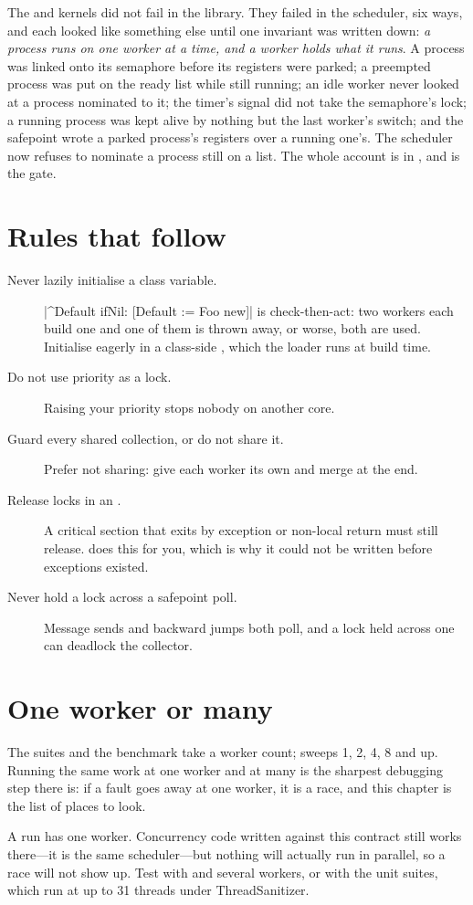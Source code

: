 The  and  kernels did not fail in the library. They
failed in the scheduler, six ways, and each looked like something else until
one invariant was written down: \emph{a process runs on one worker at a
time, and a worker holds what it runs}. A process was linked onto its
semaphore before its registers were parked; a preempted process was put on
the ready list while still running; an idle worker never looked at a process
nominated to it; the timer's signal did not take the semaphore's lock; a
running process was kept alive by nothing but the last worker's switch; and
the safepoint wrote a parked process's registers over a running one's. The
scheduler now refuses to nominate a process still on a list. The whole
account is in , and 
is the gate.

\section{Rules that follow}

\begin{description}
\item[Never lazily initialise a class variable.]
  \ct|^Default ifNil: [Default := Foo new]| is check-then-act: two workers
  each build one and one of them is thrown away, or worse, both are used.
  Initialise eagerly in a class-side , which the loader runs at
  build time.
\item[Do not use priority as a lock.] Raising your priority stops nobody on
  another core.
\item[Guard every shared collection, or do not share it.] Prefer not sharing:
  give each worker its own and merge at the end.
\item[Release locks in an .] A critical section that exits by
  exception or non-local return must still release.  does this for
  you, which is why it could not be written before exceptions existed.
\item[Never hold a lock across a safepoint poll.] Message sends and backward
  jumps both poll, and a lock held across one can deadlock the collector.
\end{description}

\section{One worker or many}

The suites and the benchmark take a worker count;  sweeps 1, 2,
4, 8 and up. Running the same work at one worker and at many is the sharpest
debugging step there is: if a fault goes away at one worker, it is a race, and
this chapter is the list of places to look.

\begin{stnote}
A  run has one worker. Concurrency code written against
this contract still works there---it is the same scheduler---but nothing will
actually run in parallel, so a race will not show up. Test with  and
several workers, or with the unit suites, which run at up to 31 threads under
ThreadSanitizer.
\end{stnote}
